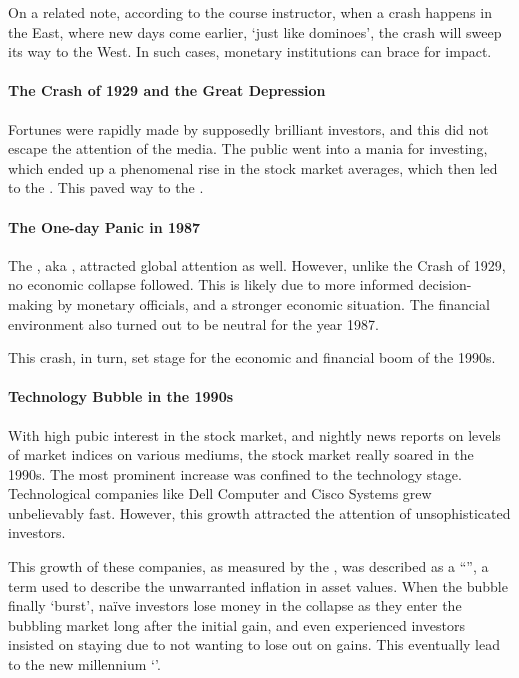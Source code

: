\documentclass[notoc,notitlepage]{tufte-book}
\begin{document}
On a related note, according to the course instructor,
when a crash happens in the East,
where new days come earlier, `just like dominoes',
the crash will sweep its way to the West.
In such cases, monetary institutions can brace for impact.

\paragraph{The Crash of 1929 and the Great Depression}
Fortunes were rapidly made by supposedly brilliant investors,
and this did not escape the attention of the media.
The public went into a mania for investing,
which ended up a phenomenal rise in the stock market averages,
which then led to the .
This paved way to the .

\paragraph{The One-day Panic in 1987}
The , aka ,
\cite{wiki:blackmonday1987} attracted global attention as well.
However, unlike the Crash of 1929, no economic collapse followed.
This is likely due to more informed decision-making by monetary officials,
and a stronger economic situation.
The financial environment also turned out to be neutral for the year 1987.

This crash, in turn, set stage for the economic and financial boom of the 1990s.

\paragraph{Technology Bubble in the 1990s}
With high pubic interest in the stock market,
and nightly news reports on levels of market indices on various mediums,
the stock market really soared in the 1990s.
The most prominent increase was confined to the technology stage.
Technological companies like Dell Computer and Cisco Systems
grew unbelievably fast.  
However, this growth attracted the attention of unsophisticated investors.

This growth of these companies,
as measured by the ,
was described as a ``'',
a term used to describe the unwarranted inflation in asset values.
When the bubble finally `burst',
naïve investors lose money in the collapse as they enter the bubbling market
long after the initial gain,
and even experienced investors insisted on staying
due to not wanting to lose out on gains.
This eventually lead to the new millennium `'.
\end{document}
